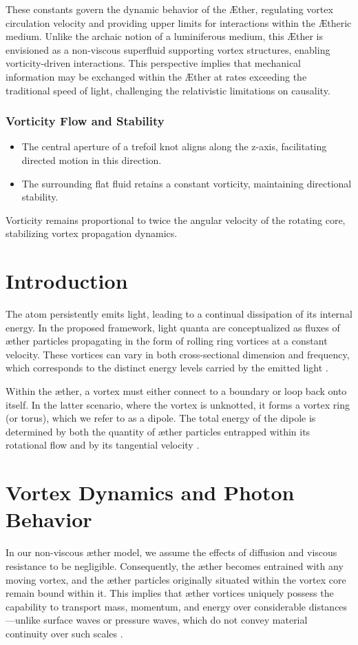 These constants govern the dynamic behavior of the \AE ther, regulating vortex circulation velocity and providing upper limits for interactions within the \AE theric medium.
Unlike the archaic notion of a luminiferous medium, this \AE ther is envisioned as a non-viscous superfluid supporting vortex structures, enabling vorticity-driven interactions.
This perspective implies that mechanical information may be exchanged within the \AE ther at rates exceeding the traditional speed of light, challenging the relativistic limitations on causality.


\subsubsection*{Vorticity Flow and Stability}

\begin{itemize}
    \item The central aperture of a trefoil knot aligns along the z-axis, facilitating directed motion in this direction.
    \item The surrounding flat fluid retains a constant vorticity, maintaining directional stability.
\end{itemize}
Vorticity remains proportional to twice the angular velocity of the rotating core, stabilizing vortex propagation dynamics.




\section{Introduction}
The atom persistently emits light, leading to a continual dissipation of its internal energy. In the proposed framework, light quanta are conceptualized as fluxes of \ae ther particles propagating in the form of rolling ring vortices at a constant velocity. These vortices can vary in both cross-sectional dimension and frequency, which corresponds to the distinct energy levels carried by the emitted light \cite{helmholtz1858, kelvin1867}.

Within the \ae ther, a vortex must either connect to a boundary or loop back onto itself. In the latter scenario, where the vortex is unknotted, it forms a vortex ring (or torus), which we refer to as a dipole. The total energy of the dipole is determined by both the quantity of \ae ther particles entrapped within its rotational flow and by its tangential velocity \cite{kleckner2013, scalo2017}.

\section{Vortex Dynamics and Photon Behavior}
In our non-viscous \ae ther model, we assume the effects of diffusion and viscous resistance to be negligible. Consequently, the \ae ther becomes entrained with any moving vortex, and the \ae ther particles originally situated within the vortex core remain bound within it. This implies that \ae ther vortices uniquely possess the capability to transport mass, momentum, and energy over considerable distances—unlike surface waves or pressure waves, which do not convey material continuity over such scales \cite{ricca1998, cahill2005}.

